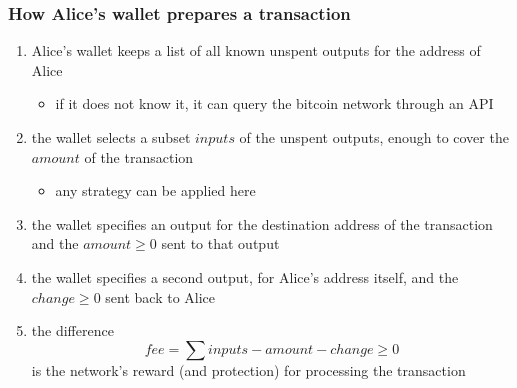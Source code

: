 \documentclass[11pt]{beamer}  %
\begin{document}
\begin{frame}\frametitle{How Alice's wallet prepares a transaction}

  \begin{enumerate}
  \item Alice's wallet keeps a list of all known unspent outputs for the address
    of Alice
    \begin{itemize}
    \item if it does not know it, it can query the bitcoin network through an API
    \end{itemize}
  \item the wallet selects a subset $\mathit{inputs}$ of the unspent outputs, enough to cover
    the $\mathit{amount}$ of the transaction
    \begin{itemize}
    \item any strategy can be applied here
    \end{itemize}
  \item the wallet specifies an output for the destination address of the transaction
    and the $\mathit{amount}\ge 0$ sent to that output
  \item the wallet specifies a second output, for Alice's address itself, and the
    $\mathit{change}\ge 0$ sent back to Alice
  \item the difference
    \[
    \mathit{fee}=\sum\mathit{inputs}-\mathit{amount}-\mathit{change}\ge 0
    \]
    is the network's reward (and protection) for processing the transaction
  \end{enumerate}

\end{frame}
\end{document}
